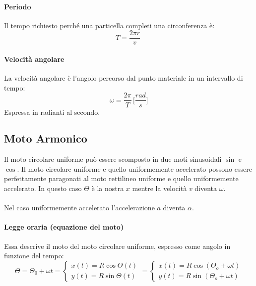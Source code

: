        \paragraph{Periodo} Il tempo richiesto perché una particella completi
        una circonferenza è:
        \begin{equation}
            T = \frac{2\pi r}{v} \;
        \end{equation}

        \paragraph{Velocità angolare} La velocità angolare è l'angolo percorso
        dal punto materiale in un intervallo di tempo:
        \begin{equation}
            \omega = \frac{2\pi}{T} \, \Bigg[\frac{rad}{s} \Bigg]
        \end{equation}
        Espressa in radianti al secondo.

    
        \subsection{Moto Armonico}  \label{moto_armonico}
        Il moto circolare uniforme può essere scomposto in due moti sinusoidali 
        $\sin$ e $\cos$.
        Il moto circolare uniforme e quello uniformemente accelerato possono 
        essere perfettamente paragonati al moto rettilineo uniforme e quello 
        uniformemente accelerato. In questo caso $\Theta$ è la nostra $x$ 
        mentre la velocità $v$ diventa $\omega$.\\\\
        Nel caso uniformemente accelerato l'accelerazione $a$ diventa $\alpha$.

        \paragraph{Legge oraria (equazione del moto)} Essa descrive il moto del
        moto circolare uniforme, espresso come angolo in funzione del tempo:
        \begin{equation}
            \Theta = \Theta_0 + \omega t = 
            \begin{cases}
                x(t)=R\cos{\Theta(t)} \\
                y(t)=R\sin{\Theta(t)}
            \end{cases} 
            = 
            \begin{cases}
                x(t)=R\cos{(\Theta_o+\omega t)} \\
                y(t)=R\sin{(\Theta_o+\omega t)}
            \end{cases}
        \end{equation}


